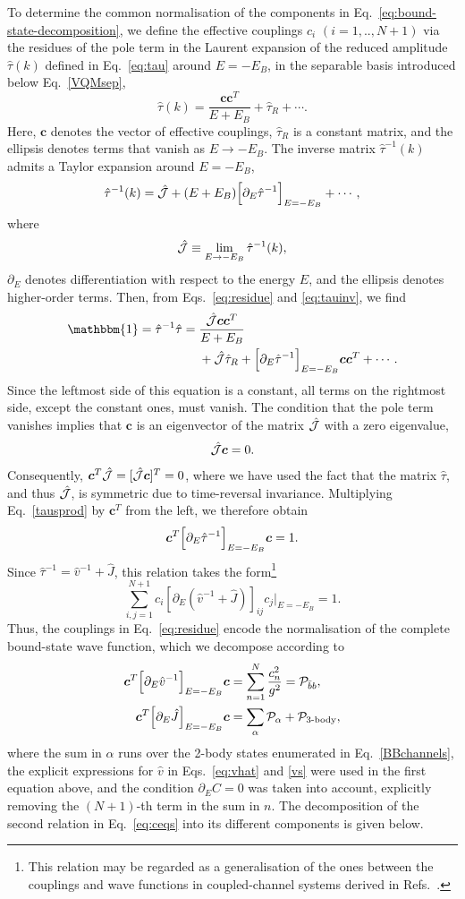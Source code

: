 \documentclass[aps,prd,showpacs,amsmath,twocolumn,superscriptaddress,floatfix,nofootinbib,notitlepage]{revtex4-2}
\newcommand{\tauEB}{\hat{\cal J}}
\newcommand{\dtauinvEB}{\Bigl[\partial_E\hat\tau^{-1}\Bigr]_{E=-E_B}}
\newcommand{\be}{\begin{equation}}
\newcommand{\ee}{\end{equation}}
\begin{document}
To determine the common normalisation of the components in Eq.~\eqref{eq:bound-state-decomposition}, we define the effective couplings $c_i$ $(i=1,..,N+1)$ via the
residues of the pole term in the Laurent expansion of the reduced amplitude $\hat\tau(k)$ defined in Eq.~\eqref{eq:tau} around $E=-E_B$, in the separable basis introduced below Eq.~\eqref{VQMsep},
\be
\hat\tau(k)
=
\frac{\bm{c}\bm{c}^T}{E+E_B}
+\hat{\tau}_R+\cdots.
\label{eq:residue}
\ee
Here, $\bm{c}$ denotes the vector of effective couplings, $\hat{\tau}_R$ is a constant matrix, and the ellipsis denotes terms that vanish as $E\to -E_B$. The inverse matrix $\hat{\tau}^{-1}(k)$ admits a Taylor expansion around $E=-E_B$,
\be
\hat{\tau}^{-1}(k)
=
\tauEB
+(E+E_B)\dtauinvEB
+\cdots,
\label{eq:tauinv}
\ee
where
\be
\tauEB \equiv\lim_{E\to -E_B}\hat{\tau}^{-1}(k),
\ee
$\partial_E$ denotes differentiation with respect to the energy $E$, and the ellipsis denotes higher-order terms. Then, from Eqs.~\eqref{eq:residue} and \eqref{eq:tauinv}, we find
\be
\begin{split}
\mathbbm{1}=
\hat{\tau}^{-1}\hat{\tau}
={}&
\frac{\tauEB\bm{c}\bm{c}^T}{E+E_B}
\\
&+\tauEB\hat{\tau}_R
+\dtauinvEB\bm{c}\bm{c}^T+\cdots\,.
\end{split}
\label{tausprod}
\ee
Since the leftmost side of this equation is a constant,
all terms on the rightmost side, except the constant ones, must vanish.
The condition that the pole term vanishes implies that $\bm{c}$ is an eigenvector of the matrix $\tauEB$ with a zero eigenvalue,
\be
\tauEB\bm{c}=0.
\label{eq:homogeneous-pole}
\ee
Consequently, $\bm{c}^T\tauEB=[\tauEB\bm{c}]^T=0$, where we have used the fact that the matrix $\hat{\tau}$, and thus $\tauEB$, is symmetric due to time-reversal invariance. Multiplying Eq.~\eqref{tausprod} by $\bm{c}^T$ from the left, we therefore obtain
\be
\bm{c}^T \dtauinvEB \bm{c}=1.
\ee
Since $\hat\tau^{-1}=\hat v^{-1}+\hat J$, this relation takes the form\footnote{This relation may be regarded as a generalisation of the ones between the couplings and wave functions in coupled-channel systems derived in Refs.~\cite{Gamermann:2009uq, Garcia-Recio:2015jsa}.}
\be
\sum_{i,j=1}^{N+1}c_i
\left[\partial_E\left(\hat v^{-1}+\hat J\right)\right]_{ij}
c_j
\Bigg|_{E=-E_B}
=1.
\label{eq:residue-normalisation}
\ee
Thus, the couplings in Eq.~\eqref{eq:residue} encode the normalisation of the complete bound-state wave function, which we decompose according to
\be
\begin{split}
\bm{c}^T \Bigl[\partial_E \hat{v}^{-1}\Bigr]_{E=-E_B}\bm{c}&=
\sum_{n=1}^N \frac{c_n^2}{g^2}={\cal P}_{\bar{b}b},\\
\bm{c}^T \Bigl[\partial_E \hat{J}\Bigr]_{E=-E_B} \bm{c} &=\sum_{
\alpha}\mathcal{P}_\alpha+\mathcal{P}_{3\text{-body}},
\end{split}
\label{eq:ceqs}
\ee
where the sum in $\alpha$ runs over the 2-body states enumerated in Eq.~\eqref{BBchannels}, the explicit expressions for $\hat v$ in Eqs.~\eqref{eq:vhat} and \eqref{vs} were used in the first equation above, and the condition $\partial_E C=0$ was taken into account, explicitly removing the $(N+1)$-th term in the sum in $n$.
The decomposition of the second relation in Eq.~\eqref{eq:ceqs} into its different components is given below.
\end{document}
